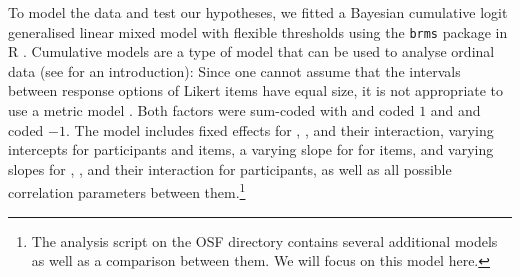 \documentclass[output=paper,colorlinks,citecolor=brown]{langscibook}
\begin{document}
To model the data and test our hypotheses, we fitted a Bayesian cumulative logit generalised linear mixed model with flexible thresholds using the \texttt{brms} package \citep{burkner_brms_2017} in R \citep{r_core_team_r_2020}.
Cumulative models are a type of model that can be used to analyse ordinal data (see \citealt{buerkner_ordinal_2019} for an introduction): 
Since one cannot assume that the intervals between response options of Likert items have equal size, it is not appropriate to use a metric model \parencite[see i.a.][]{liddell_2018_analyzing}.
Both factors were sum-coded with  and  coded $1$ and  and  coded $-1$.
The model includes fixed effects for , , and their interaction, varying intercepts for participants and items, a varying slope for  for items, and varying slopes for , , and their interaction for participants, as well as all possible correlation parameters between them.\footnote{The analysis script on the OSF directory contains several additional models as well as a comparison between them. We will focus on this model here.}
\end{document}
